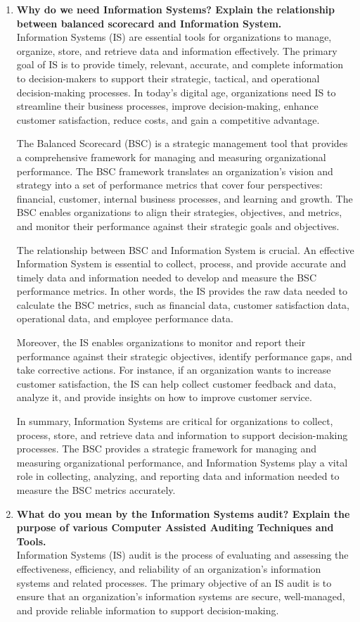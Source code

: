 \documentclass[12pt]{article}
\begin{document}
\begin{enumerate}
    \item {\bfseries Why do we need Information Systems? Explain the relationship between balanced scorecard and Information System.\\}
    Information Systems (IS) are essential tools for organizations to manage, organize, store, and retrieve data and information effectively. The primary goal of IS is to provide timely, relevant, accurate, and complete information to decision-makers to support their strategic, tactical, and operational decision-making processes. In today's digital age, organizations need IS to streamline their business processes, improve decision-making, enhance customer satisfaction, reduce costs, and gain a competitive advantage.

The Balanced Scorecard (BSC) is a strategic management tool that provides a comprehensive framework for managing and measuring organizational performance. The BSC framework translates an organization's vision and strategy into a set of performance metrics that cover four perspectives: financial, customer, internal business processes, and learning and growth. The BSC enables organizations to align their strategies, objectives, and metrics, and monitor their performance against their strategic goals and objectives.

The relationship between BSC and Information System is crucial. An effective Information System is essential to collect, process, and provide accurate and timely data and information needed to develop and measure the BSC performance metrics. In other words, the IS provides the raw data needed to calculate the BSC metrics, such as financial data, customer satisfaction data, operational data, and employee performance data.

Moreover, the IS enables organizations to monitor and report their performance against their strategic objectives, identify performance gaps, and take corrective actions. For instance, if an organization wants to increase customer satisfaction, the IS can help collect customer feedback and data, analyze it, and provide insights on how to improve customer service.

In summary, Information Systems are critical for organizations to collect, process, store, and retrieve data and information to support decision-making processes. The BSC provides a strategic framework for managing and measuring organizational performance, and Information Systems play a vital role in collecting, analyzing, and reporting data and information needed to measure the BSC metrics accurately.
\item{\bfseries  What do you mean by the Information Systems audit? Explain the purpose of various Computer Assisted Auditing Techniques and Tools.\\}
Information Systems (IS) audit is the process of evaluating and assessing the effectiveness, efficiency, and reliability of an organization's information systems and related processes. The primary objective of an IS audit is to ensure that an organization's information systems are secure, well-managed, and provide reliable information to support decision-making.


\end{enumerate}
\end{document}
